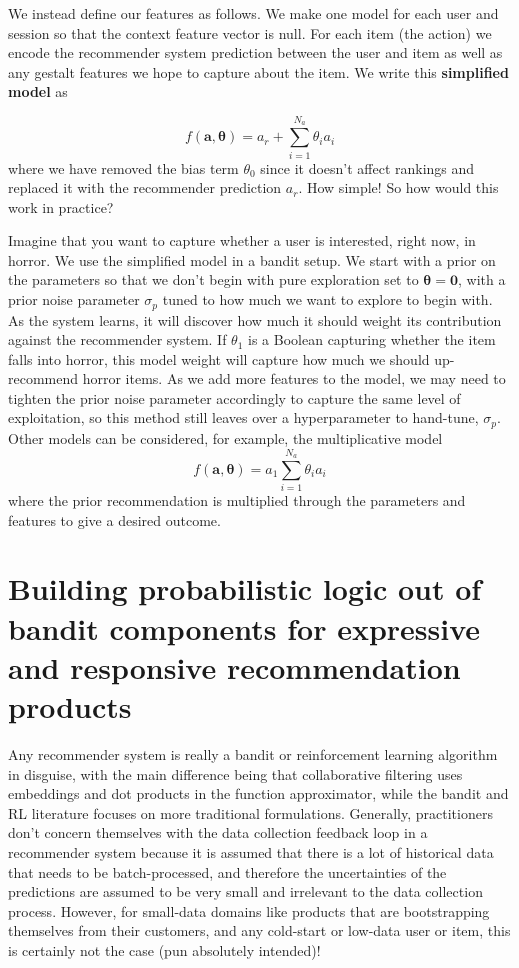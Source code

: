 \documentclass{article}
\begin{document}
We instead define our features as follows. We make one model for each user and session so that the context feature vector is null.  For each item (the action) we encode the recommender system prediction between the user and item as well as any gestalt features we hope to capture about the item. We write this \textbf{simplified model} as 

\begin{equation}
    f(\mathbf{a},\boldsymbol{\theta}) = a_r+\sum_{i=1}^{N_a}\theta_i a_i
\end{equation}where we have removed the bias term $\theta_0$ since it doesn't affect rankings and replaced it with the recommender prediction $a_r$. How simple! So how would this work in practice?

Imagine that you want to capture whether a user is interested, right now, in horror. We use the simplified model in a bandit setup. We start with a prior on the parameters so that we don't begin with pure exploration set to $\boldsymbol{\theta}=\mathbf{0}$, with a prior noise parameter $\sigma_p$ tuned to how much we want to explore to begin with. As the system learns, it will discover how much it should weight its contribution against the recommender system. If $\theta_1$ is a Boolean capturing whether the item falls into horror, this model weight will capture how much we should up-recommend horror items. As we add more features to the model, we may need to tighten the prior noise parameter accordingly to capture the same level of exploitation, so this method still leaves over a hyperparameter to hand-tune, $\sigma_p$. Other models can be considered, for example, the multiplicative model
\begin{equation}
    f(\mathbf{a},\boldsymbol{\theta}) =  a_1  \sum_{i=1}^{N_a}\theta_i a_i
\end{equation}where the prior recommendation is multiplied through the parameters and features to give a desired outcome.

\section{Building probabilistic logic out of bandit components for expressive and responsive recommendation products}

Any recommender system is really a bandit or reinforcement learning algorithm in disguise, with the main difference being that collaborative filtering uses embeddings and dot products in the function approximator, while the bandit and RL literature focuses on more traditional formulations. Generally, practitioners don't concern themselves with the data collection feedback loop in a recommender system because it is assumed that there is a lot of historical data that needs to be batch-processed, and therefore the uncertainties of the predictions are assumed to be very small and irrelevant to the data collection process. However, for small-data domains like products that are bootstrapping themselves from their customers, and any cold-start or low-data user or item, this is certainly not the case (pun absolutely intended)!
\end{document}
